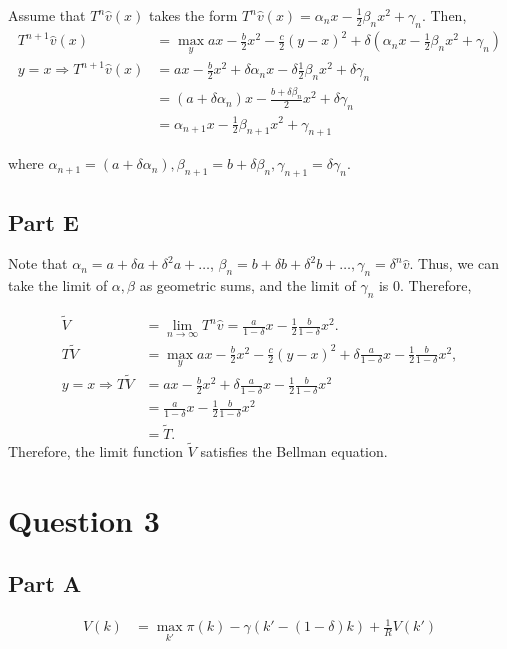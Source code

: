 \documentclass[11pt]{article} %
\begin{document}
Assume that $T^n\hat{v}(x)$ takes the form $T^n\hat{v}(x) = \alpha_n x - \frac{1}{2}\beta_n x^2 + \gamma_n.$ Then,
\begin{align*}
T^{n+1}\hat{v} (x) &= \max_y ax - \frac{b}{2}x^2 - \frac{c}{2}(y-x)^2 + \delta (\alpha_n x - \frac{1}{2}\beta_n x^2 + \gamma_n)\\
y=x \Rightarrow T^{n+1}\hat{v} (x) &= ax - \frac{b}{2}x^2 + \delta \alpha_n x - \delta \frac{1}{2}\beta_n x^2 + \delta \gamma_n\\
&= (a+\delta \alpha_n) x - \frac{b + \delta \beta_n}{2}x^2 +\delta \gamma_n\\
&= \alpha_{n+1} x - \frac{1}{2}\beta_{n+1} x^2 + \gamma_{n+1}
\end{align*}

where $\alpha_{n+1} =  (a+\delta \alpha_n) , \beta_{n+1} = b + \delta \beta_n ,  \gamma_{n+1} = \delta \gamma_n $.

\subsection{Part E}
Note that $\alpha_{n} = a + \delta a + \delta^2 a + \dots$, $\beta_n = b + \delta b + \delta^2 b + \dots, \gamma_n = \delta^n\hat{v}$. Thus, we can take the limit of $\alpha,\beta$ as geometric sums, and the limit of $\gamma_n$ is $0$. Therefore,

\begin{align*}
\tilde{V} &= \lim_{n\rightarrow \infty} T^n \hat{v} = \frac{a}{1-\delta}x - \frac{1}{2}\frac{b}{1-\delta}x^2.\\
T\tilde{V} &= \max_{y} ax - \frac{b}{2}x^2 - \frac{c}{2}(y-x)^2 + \delta \frac{a}{1-\delta}x - \frac{1}{2}\frac{b}{1-\delta}x^2,\\
y=x\Rightarrow T\tilde{V} &=  ax - \frac{b}{2}x^2 + \delta \frac{a}{1-\delta}x - \frac{1}{2}\frac{b}{1-\delta}x^2\\
&= \frac{a}{1-\delta}x - \frac{1}{2}\frac{b}{1-\delta}x^2\\
&= \tilde{T}.
\end{align*}
Therefore, the limit function $\tilde{V}$ satisfies the Bellman equation.
\section{Question 3}
\subsection{Part A}
\begin{align*}
V(k) &= \max_{k'} \pi (k) - \gamma(k' - (1-\delta)k) + \frac{1}{R}V(k')
\end{align*}
\end{document}
